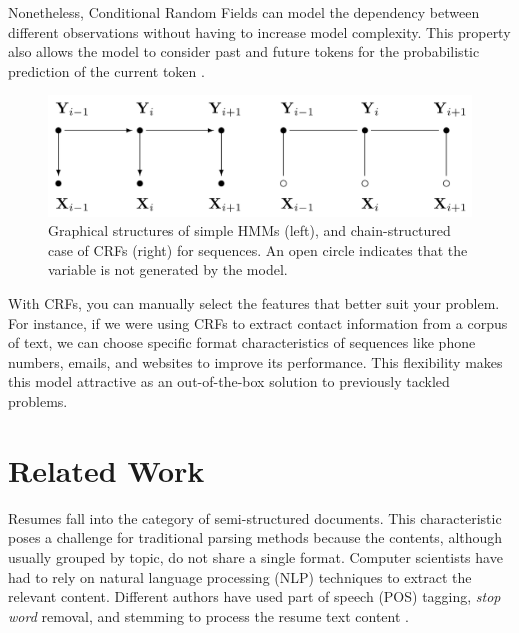   Nonetheless, Conditional Random Fields can model the dependency between
  different observations without having to increase model complexity. This
  property also allows the model to consider past and future tokens for the
  probabilistic prediction of the current token \cite{Lafferty2001}.
  \begin{figure}[ht!]
    \centering
    \includegraphics[width=\columnwidth]{hmm_vs_crf.png}
    \caption{%
      Graphical structures of simple HMMs (left), and chain-structured case of
      CRFs (right) for sequences. An open circle indicates that the variable is
      not generated by the model. \cite{Lafferty2001}
    }
  \end{figure}
  With CRFs, you can manually select the features that better suit your
  problem. For instance, if we were using CRFs to extract contact information
  from a corpus of text, we can choose specific format characteristics of
  sequences like phone numbers, emails, and websites to improve its
  performance. This flexibility makes this model attractive as an
  out-of-the-box solution to previously tackled problems.

\clearpage
\section{Related Work}

  Resumes fall into the category of semi-structured documents. This
  characteristic poses a challenge for traditional parsing methods because the
  contents, although usually grouped by topic, do not share a single format.
  Computer scientists have had to rely on natural language processing (NLP)
  techniques to extract the relevant content. Different authors have used part
  of speech (POS) tagging, \textit{stop word} removal, and stemming to process
  the resume text content \cite{Sanyal2015,Ayishathahira2018a,Roy2020a}.

